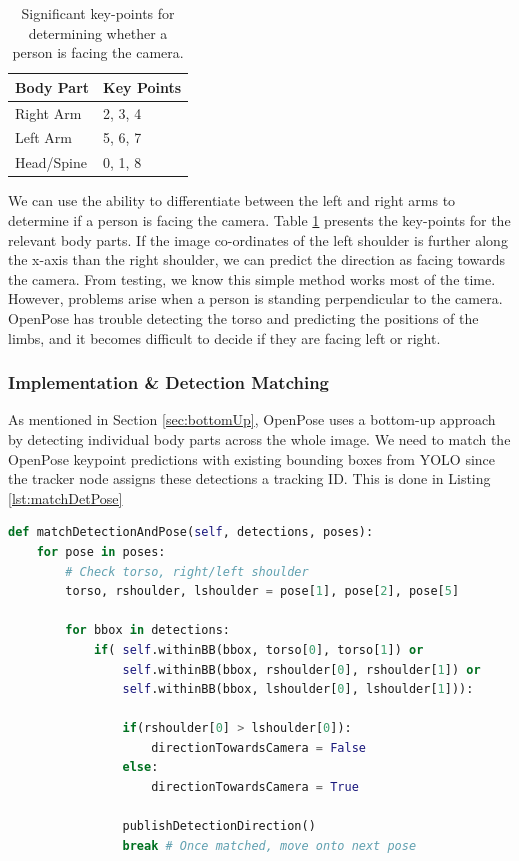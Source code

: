 \begin{table}[ht]
    \centering
    \begin{tabular}{|l|l|}
        \hline
        Body Part  & Key Points \\ \hline
        Right Arm  & 2, 3, 4    \\ \hline
        Left Arm   & 5, 6, 7    \\ \hline
        Head/Spine & 0, 1, 8    \\ \hline
    \end{tabular}
    \caption{Significant key-points for determining whether a person is facing the camera.}
    \label{tab:keypoints}
    \vspace{-1\baselineskip}
\end{table}

We can use the ability to differentiate between the left and right arms to determine if a person is facing the camera. Table \ref{tab:keypoints} presents the key-points for the relevant body parts. If the image co-ordinates of the left shoulder is further along the x-axis than the right shoulder, we can predict the direction as facing towards the camera. From testing, we know this simple method works most of the time. However, problems arise when a person is standing perpendicular to the camera. OpenPose has trouble detecting the torso and predicting the positions of the limbs, and it becomes difficult to decide if they are facing left or right.

\subsubsection{Implementation \& Detection Matching}
As mentioned in Section \ref{sec:bottomUp}, OpenPose uses a bottom-up approach by detecting individual body parts across the whole image. We need to match the OpenPose keypoint predictions with existing bounding boxes from YOLO since the tracker node assigns these detections a tracking ID. This is done in Listing \ref{lst:matchDetPose} \\

\begin{lstlisting}[language=Python, caption={Direction and Detection Matching code in people\_direction.py}, label={lst:matchDetPose}]
def matchDetectionAndPose(self, detections, poses):
    for pose in poses:
        # Check torso, right/left shoulder
        torso, rshoulder, lshoulder = pose[1], pose[2], pose[5]

        for bbox in detections:
            if( self.withinBB(bbox, torso[0], torso[1]) or
                self.withinBB(bbox, rshoulder[0], rshoulder[1]) or
                self.withinBB(bbox, lshoulder[0], lshoulder[1])):
   
                if(rshoulder[0] > lshoulder[0]):
                    directionTowardsCamera = False
                else:
                    directionTowardsCamera = True

                publishDetectionDirection() 
                break # Once matched, move onto next pose 
\end{lstlisting}


